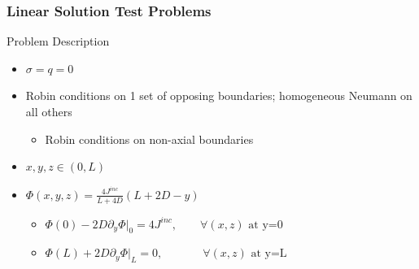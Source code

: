 \documentclass[]{beamer}
\begin{document}
\begin{frame}[t]\frametitle{Linear Solution Test Problems}
    	\begin{block}{Problem Description}
		\begin{itemize}
			\item $\sigma = q = 0$
			\item Robin conditions on 1 set of opposing boundaries; homogeneous Neumann on all others
			\begin{itemize}
				\item Robin conditions on non-axial boundaries
			\end{itemize}
			\item $x,y,z \in (0,L)$
			\item $\Phi (x,y,z) =\frac{4 J^{inc}}{L+4D} \left(  L + 2D - y  \right)$
			\begin{itemize}
				\item $\Phi(0) - 2D \partial_y \Phi|_0 = 4 J^{inc}, \qquad \forall (x,z)\text{ at y=0}$
				\item $\Phi(L) + 2D \partial_y \Phi |_L = 0, \qquad \,\,\,\,\,\,\,\,\, \forall (x,z)\text{ at y=L} $
			\end{itemize}
		\end{itemize}
	\end{block}
\end{frame}
\end{document}
